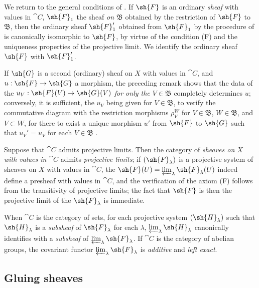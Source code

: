 \begin{env}[3.2.5]
\label{0.3.2.5}
We return to the general conditions of . If $\sh{F}$ is an
ordinary \emph{sheaf} with values in $\cat{C}$, $\sh{F}_1$ the sheaf \emph{on
$\mathfrak{B}$} obtained by the restriction of $\sh{F}$ to $\mathfrak{B}$, then
the ordinary sheaf $\sh{F}_1'$ obtained from $\sh{F}_1$ by the procedure of
 is canonically isomorphic to $\sh{F}$, by virtue of the
condition (F) and the uniqueness properties of the projective limit. We identify
the ordinary sheaf $\sh{F}$ with $\sh{F}_1'$.

If $\sh{G}$ is a second (ordinary) sheaf on $X$ with values in $\cat{C}$, and
$u:\sh{F}\to\sh{G}$ a morphism, the preceding remark shows that the data of the
$u_V:\sh{F}(V)\to\sh{G}(V)$ \emph{for only the $V\in\mathfrak{B}$} completely
determines $u$; conversely, it is sufficient, the $u_V$ being given for
$V\in\mathfrak{B}$, to verify the commutative diagram with the restriction
morphisms $\rho_V^W$ for $V\in\mathfrak{B}$, $W\in\mathfrak{B}$, and
$V\subset W$, for there to exist a unique morphism $u'$ from $\sh{F}$ to
$\sh{G}$ such that $u_V'=u_V$ for each $V\in\mathfrak{B}$ .
\end{env}

\begin{env}[3.2.6]
\label{0.3.2.6}
Suppose that $\cat{C}$ admits projective limits. Then the category of \emph{sheaves
on $X$ with values in $\cat{C}$} admits \emph{projective limits}; if
$(\sh{F}_\lambda)$ is a projective system of sheaves on $X$ with values in $\cat{C}$,
the $\sh{F}(U)=\varprojlim_\lambda\sh{F}_\lambda(U)$ indeed define a presheaf
with values in $\cat{C}$, and the verification of the axiom (F) follows from the
transitivity of projective limits; the fact that $\sh{F}$ is then the projective
limit of the $\sh{F}_\lambda$ is immediate.

When $\cat{C}$ is the category of sets, for each projective system
$(\sh{H}_\lambda)$ such
that $\sh{H}_\lambda$ is a \emph{subsheaf} of $\sh{F}_\lambda$ for each
$\lambda$, $\varprojlim_\lambda\sh{H}_\lambda$ canonically identifies with
a \emph{subsheaf} of $\varprojlim_\lambda\sh{F}_\lambda$. If $\cat{C}$ is the
category of abelian groups, the covariant functor
$\varprojlim_\lambda\sh{F}_\lambda$ is \emph{additive} and \emph{left exact}.
\end{env}

\subsection{Gluing sheaves}
\label{subsection:0.3.3}

